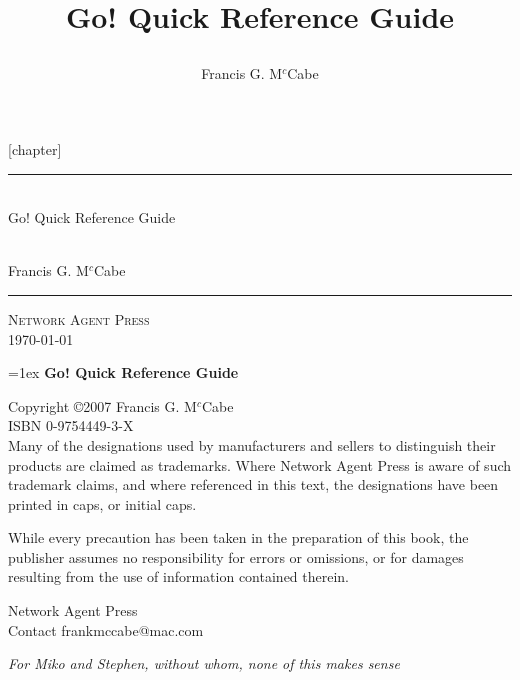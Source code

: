 \documentclass[fleqn,9pt,openright,draft]{book}
\title{\Huge Go! Quick Reference Guide\\
\large

}
\author{Francis G. M$^c$Cabe}
\newcommand{\go}{{Go!}\xspace}
\begin{document}
[chapter]

\frontmatter
\thispagestyle{empty}
\newcommand{\HRule}{\rule{\linewidth}{1mm}}
\begin{flushright}
\HRule
\\
\Huge Go! Quick Reference Guide\\
\large

\\[1ex]
\huge Francis G. M$^c$Cabe
\HRule
\end{flushright}
\begin{center}
\Large\textsc{Network Agent Press\\
\today}
\end{center}
\newpage{}
\thispagestyle{empty}
{
\parindent=0in
\parskip=1ex
{\bf\large \go Quick Reference Guide}

Copyright \copyright 2007 Francis G. M$^c$Cabe\\
ISBN 0-9754449-3-X\\

Many of the designations used by manufacturers and sellers to distinguish their products are claimed as trademarks. Where Network Agent Press is aware of such trademark claims, and where referenced in this text, the designations have been printed in caps, or initial caps.

While every precaution has been taken in the preparation of this book, the publisher assumes no responsibility for errors or omissions, or for damages resulting from the use of information contained therein.

\vspace*{4ex}
Network Agent Press\\
Contact frankmccabe@mac.com\\
}

\newpage{}
\thispagestyle{empty}
\begin{center}
\emph{For Miko and Stephen, without whom, none of this makes sense}
\end{center}
\cleardoublepage

\pagestyle{fancy}
\renewcommand{\chaptermark}[1]{\markboth{\thechapter\ #1}{}} \renewcommand{\sectionmark}[1]{\markright{\thesection\ #1}}
\fancyhf{} %
\fancyhead[LE,RO]{\bfseries\thepage}
\fancyhead[LO]{\bfseries\rightmark}
\fancyhead[RE]{\bfseries\leftmark}
\renewcommand{\headrulewidth}{0.5pt}
\renewcommand{\footrulewidth}{0pt}
\addtolength{\headheight}{0.5pt} %
\end{document}
